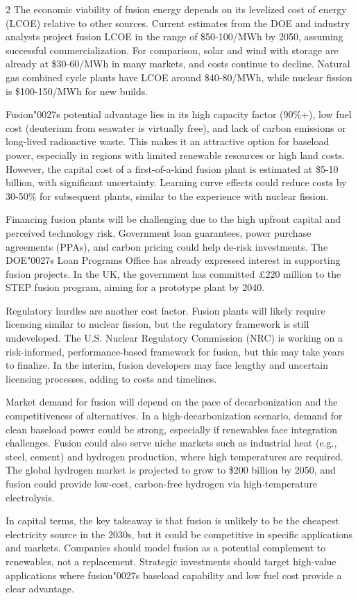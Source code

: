 \documentclass[10pt,a4paper]{article}
\newcommand{\BOApos}{{\BOQuoteFont\char"0027}}
\begin{document}
\begin{multicols}{2}
{\small The economic viability of fusion energy depends on its levelized cost of energy (LCOE) relative to other sources. Current estimates from the DOE and industry analysts project fusion LCOE in the range of \$50-100/MWh by 2050, assuming successful commercialization. For comparison, solar and wind with storage are already at \$30-60/MWh in many markets, and costs continue to decline. Natural gas combined cycle plants have LCOE around \$40-80/MWh, while nuclear fission is \$100-150/MWh for new builds.}\par
{\small Fusion\BOApos{}s potential advantage lies in its high capacity factor (90\%+), low fuel cost (deuterium from seawater is virtually free), and lack of carbon emissions or long-lived radioactive waste. This makes it an attractive option for baseload power, especially in regions with limited renewable resources or high land costs. However, the capital cost of a first-of-a-kind fusion plant is estimated at \$5-10 billion, with significant uncertainty. Learning curve effects could reduce costs by 30-50\% for subsequent plants, similar to the experience with nuclear fission.}\par
{\small Financing fusion plants will be challenging due to the high upfront capital and perceived technology risk. Government loan guarantees, power purchase agreements (PPAs), and carbon pricing could help de-risk investments. The DOE\BOApos{}s Loan Programs Office has already expressed interest in supporting fusion projects. In the UK, the government has committed £220 million to the STEP fusion program, aiming for a prototype plant by 2040.}\par
{\small Regulatory hurdles are another cost factor. Fusion plants will likely require licensing similar to nuclear fission, but the regulatory framework is still undeveloped. The U.S. Nuclear Regulatory Commission (NRC) is working on a risk-informed, performance-based framework for fusion, but this may take years to finalize. In the interim, fusion developers may face lengthy and uncertain licensing processes, adding to costs and timelines.}\par
{\small Market demand for fusion will depend on the pace of decarbonization and the competitiveness of alternatives. In a high-decarbonization scenario, demand for clean baseload power could be strong, especially if renewables face integration challenges. Fusion could also serve niche markets such as industrial heat (e.g., steel, cement) and hydrogen production, where high temperatures are required. The global hydrogen market is projected to grow to \$200 billion by 2050, and fusion could provide low-cost, carbon-free hydrogen via high-temperature electrolysis.}\par
{\small In capital terms, the key takeaway is that fusion is unlikely to be the cheapest electricity source in the 2030s, but it could be competitive in specific applications and markets. Companies should model fusion as a potential complement to renewables, not a replacement. Strategic investments should target high-value applications where fusion\BOApos{}s baseload capability and low fuel cost provide a clear advantage.}\par
\end{multicols}
\end{document}
